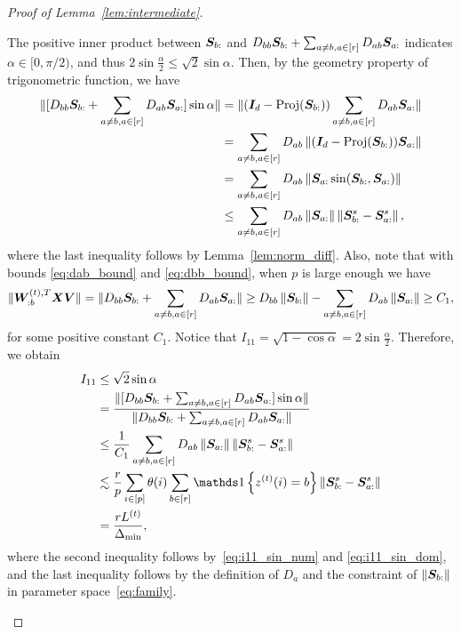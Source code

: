 \documentclass[lettersize,onecolumn,journal]{IEEEtran}
\theoremstyle{definition}
\theoremstyle{definition}
\newcommand{\offf}[1]{\left\{#1\right\}}
\begin{document}
\begin{proof}[Proof of Lemma~\ref{lem:intermediate}]
\begin{enumerate}
    The positive inner product between $\bm S_{b:}$ and $D_{bb} \bm S_{b:} + \sum_{a \neq b, a \in [r]} D_{ab} \bm S_{a:}$ indicates $\alpha \in [0,  \pi/2)$, and thus $2\sin \frac{\alpha}{2} \leq \sqrt{2} \sin \alpha$. Then, by the geometry property of trigonometric function, we have 
    \begin{align}
       \onormSize{}{ [D_{bb} \mS_{b:} + \sum_{a \neq b, a \in [r]} D_{ab} \mS_{a:}] \sin \alpha} &= \onormSize{}{(\mI_d - \text{Proj}(\mS_{b:})) \sum_{a \neq b, a \in [r]} D_{ab} \mS_{a:}}\\
       & = \sum_{a \neq b, a \in [r]} D_{ab} \onorm{(\mI_d - \text{Proj}(\mS_{b:}))\mS_{a:}  }\\
       &= \sum_{a \neq b, a \in [r]} D_{ab} \onorm{ \mS_{a:} \sin (\mS_{b:}, \mS_{a:}) }\\
       & \leq \sum_{a \neq b, a \in [r]} D_{ab} \onorm{\mS_{a:}} \onorm{ \mS^s_{b:} - \mS^s_{a:}}, \label{eq:i11_sin_num}
    \end{align}
    where the last inequality follows by Lemma~\ref{lem:norm_diff}. Also, note that with bounds \eqref{eq:dab_bound} and \eqref{eq:dbb_bound}, when $p$ is large enough we have 
    \begin{equation}\label{eq:i11_sin_dom}
           \onormSize{}{\mW_{:b}^{(t), T} \mX \mV } = \onormSize{}{ D_{bb} \mS_{b:} + \sum_{a \neq b, a \in [r]} D_{ab} \mS_{a:}}  \geq D_{bb} \onorm{\mS_{b:}} - \sum_{a \neq b, a \in [r]} D_{ab} \onorm{ \mS_{a:}} \geq C_1,
    \end{equation}
    for some positive constant $C_1$. Notice that $I_{11} = \sqrt{1 - \cos \alpha} = 2 \sin \frac{\alpha}{2}$. Therefore, we obtain
    \begin{align}
        I_{11} &\leq \sqrt{2} \sin \alpha \\
        & = \frac{  \onormSize{}{ [D_{bb} \mS_{b:} + \sum_{a \neq b, a \in [r]} D_{ab} \mS_{a:}] \sin \alpha}}{  \onormSize{}{ D_{bb} \mS_{b:} + \sum_{a \neq b, a \in [r]} D_{ab} \mS_{a:}} } \\
        & \leq \frac{ 1}{C_1}  \sum_{a \neq b, a \in [r]} D_{ab} \onorm{\mS_{a:}} \onorm{ \mS^s_{b:} - \mS^s_{a:}} \\
        & \lesssim \frac{r}{p} \sum_{i \in [p]} \theta(i) \sum_{b \in [r]} \ind\offf{z^{(t)}(i) = b} \onorm{ \mS^s_{b:} - \mS^s_{a:}}\\
        & = \frac{r L^{(t)}}{\Delta_{\min}},\label{eq:i11}
    \end{align}
    where the second inequality follows by~\eqref{eq:i11_sin_num} and \eqref{eq:i11_sin_dom}, and the last inequality follows by the definition of $D_a$ and the constraint of $\left\lVert\bm S_{b:}\right\rVert$ in parameter space~\eqref{eq:family}.
    

\end{enumerate}
\end{proof}
\end{document}
